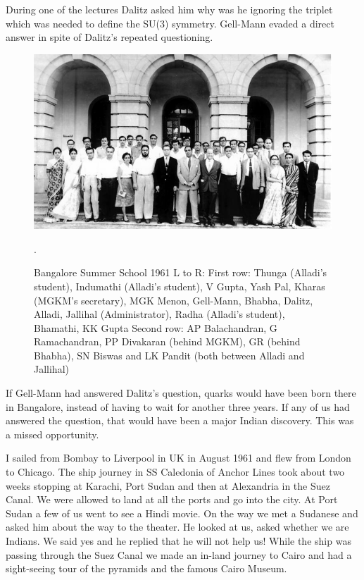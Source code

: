 During one of the lectures Dalitz asked him why was he igno\-ring the 
triplet which was needed to define the SU(3) symmetry. Gell-Mann evaded 
a direct answer in spite of Dalitz's repeated questioning.
\medskip

\begin{figure}[h]
\centering
\includegraphics[width=\textwidth]{images/Rajaji-gellmann.jpg}
\caption{Bangalore Summer School 1961
L to R: First row: Thunga (Alladi's student), Indumathi (Alladi's
student), V Gupta, Yash Pal, Kharas (MGKM's secretary), MGK Menon, 
Gell-Mann, Bhabha, Dalitz, Alladi, Jallihal (Administrator), 
Radha (Alladi's student), Bhamathi, KK Gupta
Second row: AP Balachandran, G Ramachandran, PP Divakaran (behind
MGKM), GR (behind Bhabha), SN Biswas and LK Pandit (both between
Alladi and Jallihal)}.
\end{figure}
\eject
 
If Gell-Mann had answered Dalitz's question, quarks would have been born 
there in Bangalore, instead of having to wait for another three years. 
If any of us had answered the question, that would have been a major 
Indian discovery. This was a missed opportunity.

I sailed from Bombay to Liverpool in UK in August 1961 and flew from 
London to Chicago. The ship journey in SS Caledonia of Anchor Lines took 
about two weeks stopping at Karachi, Port Sudan and then at Alexandria 
in the Suez Canal. We were allowed to land at all the ports and go into 
the city. At Port Sudan a few of us went to see a Hindi movie. On the 
way we met a Sudanese and asked him about the way to the theater. He 
looked at us, asked whether we are Indians. We said yes and he replied 
that he will not help us! While the ship was passing through the Suez 
Canal we made an in-land journey to Cairo and had a sight-seeing tour of 
the pyramids and the famous Cairo Museum.


